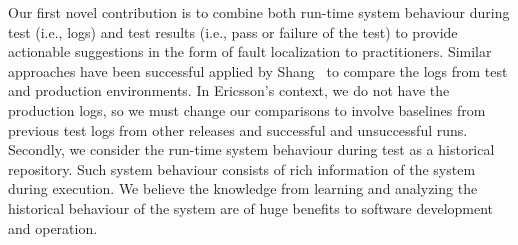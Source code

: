 Our first novel contribution is to combine both run-time system behaviour during test (i.e., logs) and test results (i.e., pass or failure of the test) to provide actionable suggestions in the form of fault localization to practitioners. Similar approaches have been successful applied by Shang~\cite{Shang:2013:ADB:2486788.2486842} to compare the logs from test and production environments. In Ericsson's context, we do not have the production logs, so we must change our comparisons to involve baselines from previous test logs from other releases and successful and unsuccessful runs. Secondly, we consider the run-time system behaviour during test as a historical repository. Such system behaviour consists of rich information of the system during execution. We believe the knowledge from learning and analyzing the historical behaviour of the system are of huge benefits to software development and operation.

